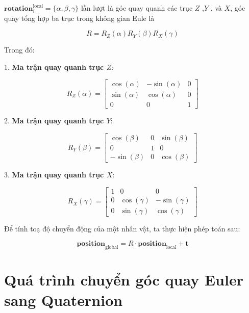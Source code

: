	
$\mathbf{rotation}_i^{\operatorname{local}} = \{ \alpha ,\beta , \gamma \}$ lần lượt là góc quay quanh các trục $Z$ ,$Y$ , và $X$, góc quay tổng hợp ba trục trong không gian Eule là 

\begin{equation}
R = R_Z(\alpha) R_Y(\beta) R_X(\gamma)
\end{equation}

Trong đó:

1. \textbf{Ma trận quay quanh trục \(Z\)}:

\[
R_Z(\alpha) = 
\begin{bmatrix}
	\cos(\alpha) & -\sin(\alpha) & 0 \\
	\sin(\alpha) & \cos(\alpha) & 0 \\
	0 & 0 & 1
\end{bmatrix}
\]

2. \textbf{Ma trận quay quanh trục \(Y\)}:

\[
R_Y(\beta) = 
\begin{bmatrix}
	\cos(\beta) & 0 & \sin(\beta) \\
	0 & 1 & 0 \\
	-\sin(\beta) & 0 & \cos(\beta)
\end{bmatrix}
\]

3. \textbf{Ma trận quay quanh trục \(X\)}:

\[
R_X(\gamma) = 
\begin{bmatrix}
	1 & 0 & 0 \\
	0 & \cos(\gamma) & -\sin(\gamma) \\
	0 & \sin(\gamma) & \cos(\gamma)
\end{bmatrix}
\]

Để tính toạ độ chuyển động của một nhân vật, ta thực hiện phép toán sau:

\begin{equation}
	\mathbf{position}_{\text{global}} = R \cdot \mathbf{position}_{\text{local}} + \mathbf{t}
\end{equation}


\section{Quá trình chuyển góc quay Euler sang Quaternion}




